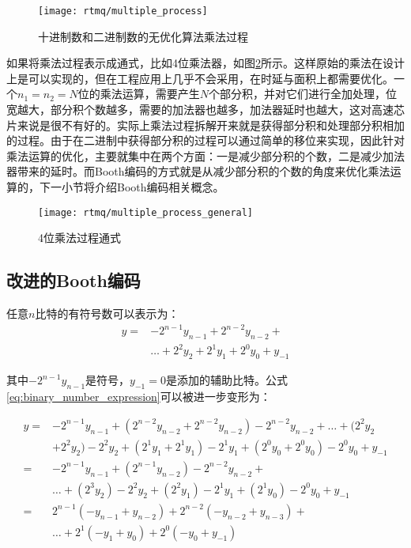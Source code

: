 \begin{figure}
    \centering
    \caption[十进制数和二进制数的无优化算法乘法过程]{十进制数和二进制数的无优化算法乘法过程\label{fig:multiple_process}}
    \texttt{[image: rtmq/multiple\_process]}
\end{figure}

如果将乘法过程表示成通式，比如4位乘法器，如图\ref{fig:multiple_process_general}所示。这样原始的乘法在设计上是可以实现的，但在工程应用上几乎不会采用，在时延与面积上都需要优化。一个$n_1=n_2=N$位的乘法运算，需要产生$N$个部分积，并对它们进行全加处理，位宽越大，部分积个数越多，需要的加法器也越多，加法器延时也越大，这对高速芯片来说是很不有好的。实际上乘法过程拆解开来就是获得部分积和处理部分积相加的过程。由于在二进制中获得部分积的过程可以通过简单的移位来实现，因此针对乘法运算的优化，主要就集中在两个方面：一是减少部分积的个数，二是减少加法器带来的延时。而Booth编码的方式就是从减少部分积的个数的角度来优化乘法运算的，下一小节将介绍Booth编码相关概念。

\begin{figure}
    \centering
    \caption[4位乘法过程通式]{4位乘法过程通式\label{fig:multiple_process_general}}
    \texttt{[image: rtmq/multiple\_process\_general]}
\end{figure}

\subsection[改进的Booth编码]{改进的Booth编码}

任意$n$比特的有符号数可以表示为：
\begin{align}
    y=&-2^{n-1} y_{n-1}+2^{n-2} y_{n-2}+\\
    &…+2^2 y_2+2^1 y_1+2^0 y_0+y_{-1}\label{eq:binary_number_expression}
\end{align}

其中$-2^{n-1} y_{n-1}$是符号，$y_{-1}=0$是添加的辅助比特。公式\ref{eq:binary_number_expression}可以被进一步变形为：

\begin{align}
    y=&-2^{n-1} y_{n-1}+(2^{n-2} y_{n-2}+2^{n-2} y_{n-2} )-2^{n-2} y_{n-2}+…+(2^2 y_2\\
    &+2^2 y_2 )-2^2 y_2+(2^1 y_1+2^1 y_1 )-2^1 y_1+(2^0 y_0+2^0 y_0 )-2^0 y_0+y_{-1}\\
    =&-2^{n-1} y_{n-1}+(2^{n-1} y_{n-2} )-2^{n-2} y_{n-2}+\\
    &…+(2^3 y_2 )−2^2 y_2+(2^2 y_1 )-2^1 y_1+(2^1 y_0 )-2^0 y_0+y_{-1}\\
    =&2^{n-1} (-y_{n-1}+y_{n-2} )+2^{n-2} (-y_{n-2}+y_{n-3} )+\\
    &…+2^1 (-y_1+y_0 )+2^0 (-y_0+y_{-1})\label{eq:binary_number_expression1}
\end{align}

